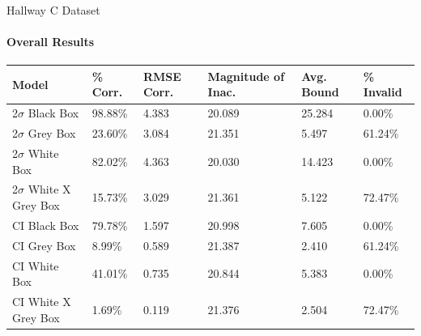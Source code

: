 \documentclass{beamer}
\begin{document}
\begin{frame}[t]{Hallway C Dataset}
  \framesubtitle{Overall Results}

  \vspace*{-0.5cm}
  \begin{table}[htp!]
  \small
  \begin{tabular}{|p{2.5cm}|p{1.3cm}|p{1.0cm}|p{1.7cm}|p{1.0cm}|p{1.5cm}|}

      \hline
      \textbf{Model} &
      \textbf{\% Corr.} &
      \textbf{RMSE Corr.} &
      \textbf{Magnitude of Inac.} &
      \textbf{Avg. Bound} &
      \textbf{\% Invalid} \\
      \hline

      2$\sigma$ Black Box &
      98.88\% &
      4.383 &
      20.089 &
      25.284 &
      0.00\% \\
      \hline

      2$\sigma$ Grey Box &
      23.60\% &
      3.084 &
      21.351 &
      5.497 &
      61.24\% \\
      \hline

      2$\sigma$ White Box &
      82.02\% &
      4.363 &
      20.030 &
      14.423 &
      0.00\% \\
      \hline

      2$\sigma$ White X Grey Box &
      15.73\% &
      3.029 &
      21.361 &
      5.122 &
      72.47\% \\
      \hline

      CI Black Box &
      79.78\% &
      1.597 &
      20.998 &
      7.605 &
      0.00\% \\
      \hline

      CI Grey Box &
      8.99\% &
      0.589 &
      21.387 &
      2.410 &
      61.24\% \\
      \hline

      CI White Box &
      41.01\% &
      0.735 &
      20.844 &
      5.383 &
      0.00\% \\
      \hline

      CI White X Grey Box &
      1.69\% &
      0.119 &
      21.376 &
      2.504 &
      72.47\% \\
      \hline



\end{tabular}
\end{table}

\end{frame}
\end{document}
